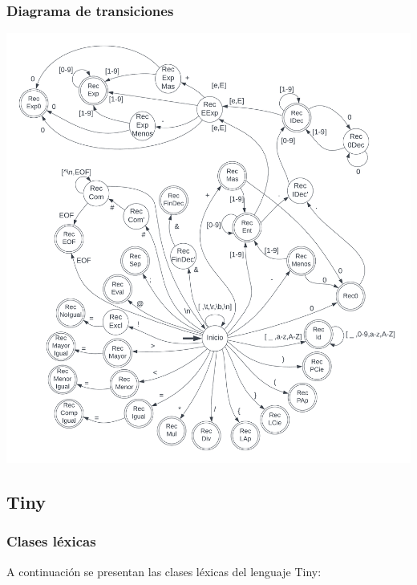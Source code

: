 \documentclass[11pt]{article}
\begin{document}
    \subsubsection{Diagrama de transiciones}
        \includegraphics[scale=0.2]{tiny0}
    \subsection{Tiny}
        \subsubsection{Clases léxicas}
        A continuación se presentan las clases léxicas del lenguaje Tiny:
\end{document}
